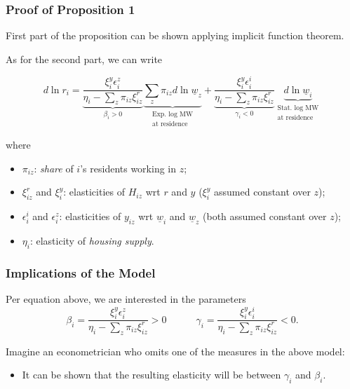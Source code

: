 \begin{frame}[label = proof_main]
	\frametitle{Proof of Proposition 1}
	
	First part of the proposition can be shown applying implicit function theorem. 
	\hyperlink{proof_prop_1}{}
	
	\pause
	\vspace{2mm}
	As for the second part, we can write
	
	$$
	d \ln r_i
	= \underbrace{\frac{\xi_i^y \epsilon_i^z}
		   {\eta_i - \sum_z \pi_{i z} \xi_{i z}^r}}_{\beta_i > 0}
		   \underbrace{\sum_z \pi_{i z} d \ln \underline{w}_z}_{
		   		\substack{\text{Exp. log MW}\\\text{at residence}}}
	+ \underbrace{\frac{\xi_i^y \epsilon_i^i}
		   {\eta_i - \sum_z\pi_{i z}\xi_{i z}^r}}_{\gamma_i < 0}
		   \underbrace{d \ln \underline{w}_i}_{
		   		\substack{\text{Stat. log MW}\\\text{at residence}}}
	$$
	
	\vspace{-1mm}
	where 
	\begin{itemize} \small
		\item $\pi_{i z}$: \textit{share} of $i$'s residents 
		working in $z$;
		
		\item $\xi_{i z}^r$ and $\xi_{i}^y$: 
		elasticities of $H_{i z}$ wrt $r$ and $y$ 
		($\xi_{i}^y$ assumed constant over $z$);
		
		\item $\epsilon_{i}^i$ and $\epsilon_{i}^z$: elasticities of 
		$y_{i z}$ wrt $\underline{w}_i$ and $\underline{w}_z$
		(both assumed constant over $z$);
		
		\item $\eta_i$: elasticity of \textit{housing supply}.
	\end{itemize}
	
\end{frame}

\begin{frame}
	\frametitle{Implications of the Model}
	
	Per equation above, we are interested in the parameters
	$$ \beta_i = \frac{\xi_i^y \epsilon_i^z}
	{\eta_i - \sum_z \pi_{i z} \xi_{i z}^r} > 0 
	\quad \quad \quad 
	\gamma_i = \frac{\xi_i^y \epsilon_i^i}
	{\eta_i - \sum_z\pi_{i z}\xi_{i z}^r} < 0 .	$$
	
	
	\vspace{3mm}
	\pause
	Imagine an econometrician who omits one of the measures in the above model:
	\begin{itemize}
		\item It can be shown that the resulting elasticity will be between $\gamma_i$ 
		and $\beta_i$.
	\end{itemize}
\end{frame}

